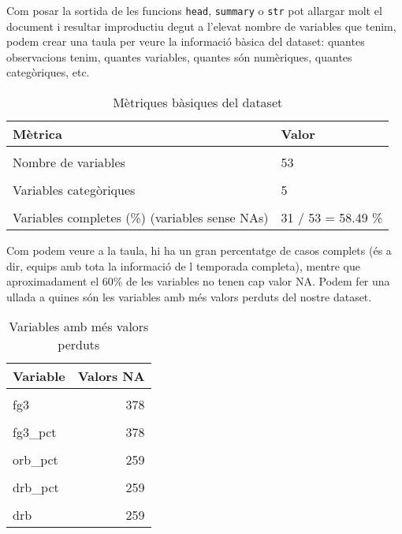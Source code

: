 \documentclass[
]{article}
\begin{document}
Com posar la sortida de les funcions \texttt{head}, \texttt{summary} o
\texttt{str} pot allargar molt el document i resultar improductiu degut
a l'elevat nombre de variables que tenim, podem crear una taula per
veure la informació bàsica del dataset: quantes observacions tenim,
quantes variables, quantes són numèriques, quantes categòriques, etc.

\begin{table}[!h]

\caption{\label{tab:unnamed-chunk-2}Mètriques bàsiques del dataset}
\centering
\begin{tabular}[t]{ll}
\toprule
Mètrica & Valor\\
\midrule
\cellcolor{gray!6}{Nombre d'observacions} & \cellcolor{gray!6}{1900}\\
Nombre de variables & 53\\
\cellcolor{gray!6}{Variables numèriques} & \cellcolor{gray!6}{48}\\
Variables categòriques & 5\\
\cellcolor{gray!6}{Casos complets (\%) (observacions sense NAs)} & \cellcolor{gray!6}{1522 / 1900  =  80.11 \%}\\
\addlinespace
Variables completes (\%) (variables sense NAs) & 31 / 53  =  58.49 \%\\
\bottomrule
\end{tabular}
\end{table}

Com podem veure a la taula, hi ha un gran percentatge de casos complets
(és a dir, equips amb tota la informació de l temporada completa),
mentre que aproximadament el 60\% de les variables no tenen cap valor
NA. Podem fer una ullada a quines són les variables amb més valors
perduts del nostre dataset.

\begin{table}[!h]

\caption{\label{tab:unnamed-chunk-3}Variables amb més valors perduts}
\centering
\begin{tabular}[t]{lr}
\toprule
Variable & Valors NA\\
\midrule
\cellcolor{gray!6}{fg3a\_per\_fga\_pct} & \cellcolor{gray!6}{378}\\
fg3 & 378\\
\cellcolor{gray!6}{fg3a} & \cellcolor{gray!6}{378}\\
fg3\_pct & 378\\
\cellcolor{gray!6}{tov\_pct} & \cellcolor{gray!6}{259}\\
\addlinespace
orb\_pct & 259\\
\cellcolor{gray!6}{opp\_tov\_pct} & \cellcolor{gray!6}{259}\\
drb\_pct & 259\\
\cellcolor{gray!6}{orb} & \cellcolor{gray!6}{259}\\
drb & 259\\
\bottomrule
\end{tabular}
\end{table}
\end{document}
